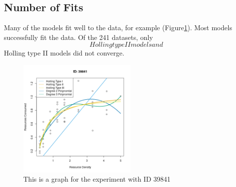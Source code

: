 \documentclass{article}
\begin{document}
\subsection{Number of Fits}
Many of the models fit well to the data, for example (Figure\ref{fig:2}). Most models successfully fit the data. Of the 241 datasets, only $$ Holling type II models and $$ Holling type II models did not converge. 
\begin{figure}[h!t] 
    \centering
    \includegraphics[width=2.3in]{../Results/Plots/39841.png}
    \caption{This is a graph for the experiment with ID 39841}
    \label{fig:2}
\end{figure}
\end{document}
